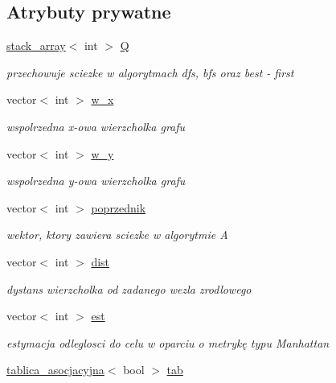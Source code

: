 \subsection*{Atrybuty prywatne}
\begin{DoxyCompactItemize}
\item 
\hyperlink{classstack__array}{stack\-\_\-array}$<$ int $>$ \hyperlink{classgraf_a9d7d7f9781f344e37cc41ef26e0f690a}{Q}
\begin{DoxyCompactList}\small\item\em przechowuje sciezke w algorytmach dfs, bfs oraz best -\/ first \end{DoxyCompactList}\item 
vector$<$ int $>$ \hyperlink{classgraf_add49fee88b9df326c31bb81318f8bb39}{w\-\_\-x}
\begin{DoxyCompactList}\small\item\em wspolrzedna x-\/owa wierzcholka grafu \end{DoxyCompactList}\item 
vector$<$ int $>$ \hyperlink{classgraf_a43cbf9a972dc7cad492fb8fc811a51d1}{w\-\_\-y}
\begin{DoxyCompactList}\small\item\em wspolrzedna y-\/owa wierzcholka grafu \end{DoxyCompactList}\item 
vector$<$ int $>$ \hyperlink{classgraf_a46ea752f882ac298a838907a32466a7a}{poprzednik}
\begin{DoxyCompactList}\small\item\em wektor, ktory zawiera sciezke w algorytmie A \end{DoxyCompactList}\item 
vector$<$ int $>$ \hyperlink{classgraf_aa16a7a8009745b43e5d34494696ebb5e}{dist}
\begin{DoxyCompactList}\small\item\em dystans wierzcholka od zadanego wezla zrodlowego \end{DoxyCompactList}\item 
vector$<$ int $>$ \hyperlink{classgraf_a7592be0ba67c7dac367fefa53cc32b5f}{est}
\begin{DoxyCompactList}\small\item\em estymacja odleglosci do celu w oparciu o metrykę typu Manhattan \end{DoxyCompactList}\item 
\hyperlink{classtablica__asocjacyjna}{tablica\-\_\-asocjacyjna}$<$ bool $>$ \hyperlink{classgraf_a563284d00331e414f9d124da73e43dd6}{tab}

\end{DoxyCompactItemize}
